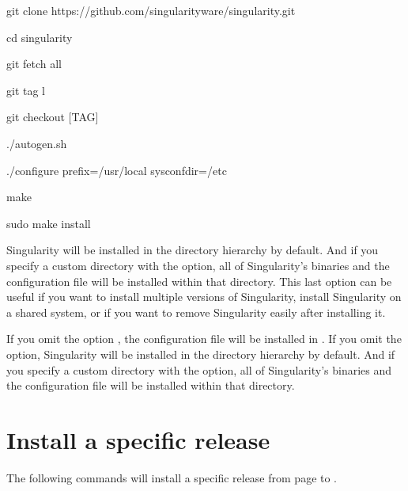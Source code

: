 \documentclass[letterpaper,10pt,english]{sphinxmanual}
\begin{document}
%
\begin{sphinxVerbatim}[commandchars=\\\{\}]
\PYGZdl{} git clone https://github.com/singularityware/singularity.git

\PYGZdl{} cd singularity

\PYGZdl{} git fetch \PYGZhy{}\PYGZhy{}all

\PYGZdl{} git tag \PYGZhy{}l

\PYGZdl{} git checkout [TAG]

\PYGZdl{} ./autogen.sh

\PYGZdl{} ./configure \PYGZhy{}\PYGZhy{}prefix=/usr/local \PYGZhy{}\PYGZhy{}sysconfdir=/etc

\PYGZdl{} make

\PYGZdl{} sudo make install
\end{sphinxVerbatim}

Singularity will be installed in the  directory hierarchy by default.
And if you specify a custom directory with the  option, all of
Singularity’s binaries and the configuration file will be installed within that
directory. This last option can be useful if you want to install multiple versions
of Singularity, install Singularity on a shared system, or if you want to remove
Singularity easily after installing it.

If you omit the  option , the configuration file will be installed in .
If you omit the  option, Singularity will be installed in the  directory
hierarchy by default. And if you specify a custom directory with the 
option, all of Singularity’s binaries and the configuration file will be installed within that directory.


\section{Install a specific release}
\label{\detokenize{installation:install-a-specific-release}}
The following commands will install a specific release from  page to .
\end{document}
